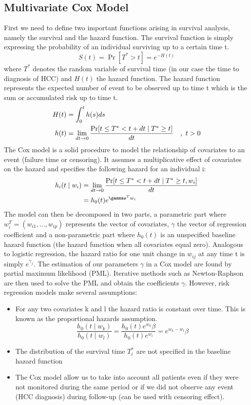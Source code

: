 \documentclass[11pt,twoside]{article}
\numberwithin{Theorem}{section}
\numberwithin{Definition}{section}
\numberwithin{Lemma}{section}
\numberwithin{Algorithm}{section}
\numberwithin{equation}{section}
\begin{document}
\subsection{Multivariate Cox Model}
First we need to define two important functions arising in survival analysis, namely the survival and the hazard function.
The survival function is simply expressing the probability of an individual surviving up to a certain time t.
$$S(t) = \Pr[T^*>t]= e^{-H(t)}$$ where $T^*$ denotes the random variable of survival time (in our case the time to diagnosis of HCC) and $H(t)$ the hazard function. The hazard function represents the expected number of event to be observed up to time t which is the sum or accumulated risk up to time t.
\begin{align}
    H(t) &= \int_{0}^{t} h(s) ds \\
    h(t)&=\lim_{dt\to 0} \frac{\Pr[t\leq T^* < t+dt\mid T^* \geq t]}
{dt} \quad \text{,\, $t>0$}
\end{align}
The Cox model is a solid procedure to model the relationship of covariates to an event (failure time or censoring). It assumes a multiplicative effect of covariates on the hazard and specifies the following hazard for an individual i:
\begin{align}
    h_i(t\mid w_i) &=\lim_{dt\to 0} \frac{\Pr[t\leq T^* < t+dt\mid
    T^* \geq t,w_i]}{dt} \\
    &= h_0(t)e^{\gammaw^{T} w_i}
\end{align}
The model can then be decomposed in two parts, a parametric part where $w_i^T=(w_{i1},\dots,w_{ip})$ represents the vector of covariates, $\gamma$ the vector of regression coefficient and a non-parametric part where $h_0(t)$ is an unspecified baseline hazard function (the hazard function when all covariates equal zero).
Analogous to logistic regression, the hazard ratio for one unit change in $w_{ij}$ at any time t is simply $e^{\gamma_j}$.
The estimation of our parameters $\gamma$ in a Cox model are found by partial maximum likelihood (PML). Iterative methods such as Newton-Raphson are then used to solve the PML and obtain the coefficients $\gamma$.
However, risk regression models make several assumptions:
\begin{itemize}
    \item For any two covariates k and l the hazard ratio is constant over time. This is known as the proportional hazards assumption.
        $$\frac{h_0(t\mid w_k)}{h_0(t\mid w_l)}=\frac{h_0(t)e^{w_k}\beta}{h_0(t)e^{w_l}}=e^{w_k-w_l}\beta$$
   \item The distribution of the survival time $T_i^*$ are not specified in the baseline hazard function
   \item The Cox model allow us to take into account all patients even if they were not monitored during the same period or if we did not observe any event (HCC diagnosis) during follow-up (can be used with censoring effect).
\end{itemize}
%
%
%
%
%
%
%
\end{document}
